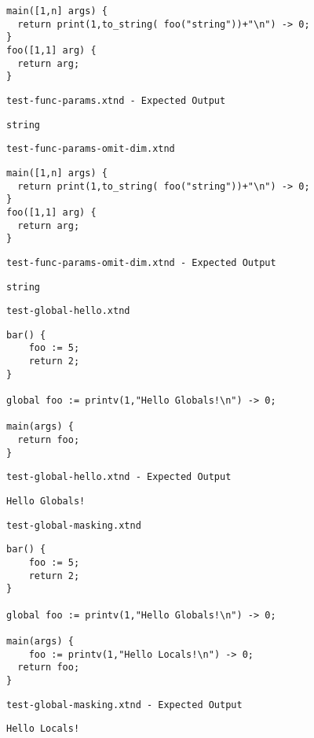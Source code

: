 \begin{lstlisting}
main([1,n] args) {
  return print(1,to_string( foo("string"))+"\n") -> 0;
}
foo([1,1] arg) {
  return arg;
}
\end{lstlisting}


\medskip \noindent \texttt{test-func-params.xtnd - Expected Output}


\begin{lstlisting}
string
\end{lstlisting}


\medskip \noindent \texttt{test-func-params-omit-dim.xtnd}


\begin{lstlisting}
main([1,n] args) {
  return print(1,to_string( foo("string"))+"\n") -> 0;
}
foo([1,1] arg) {
  return arg;
}
\end{lstlisting}


\medskip \noindent \texttt{test-func-params-omit-dim.xtnd - Expected Output}


\begin{lstlisting}
string
\end{lstlisting}


\medskip \noindent \texttt{test-global-hello.xtnd}


\begin{lstlisting}
bar() {
	foo := 5;
	return 2;
}

global foo := printv(1,"Hello Globals!\n") -> 0;

main(args) {
  return foo;
}
\end{lstlisting}


\medskip \noindent \texttt{test-global-hello.xtnd - Expected Output}


\begin{lstlisting}
Hello Globals!
\end{lstlisting}


\medskip \noindent \texttt{test-global-masking.xtnd}


\begin{lstlisting}
bar() {
	foo := 5;
	return 2;
}

global foo := printv(1,"Hello Globals!\n") -> 0;

main(args) {
	foo := printv(1,"Hello Locals!\n") -> 0;
  return foo;
}
\end{lstlisting}


\medskip \noindent \texttt{test-global-masking.xtnd - Expected Output}


\begin{lstlisting}
Hello Locals!
\end{lstlisting}


